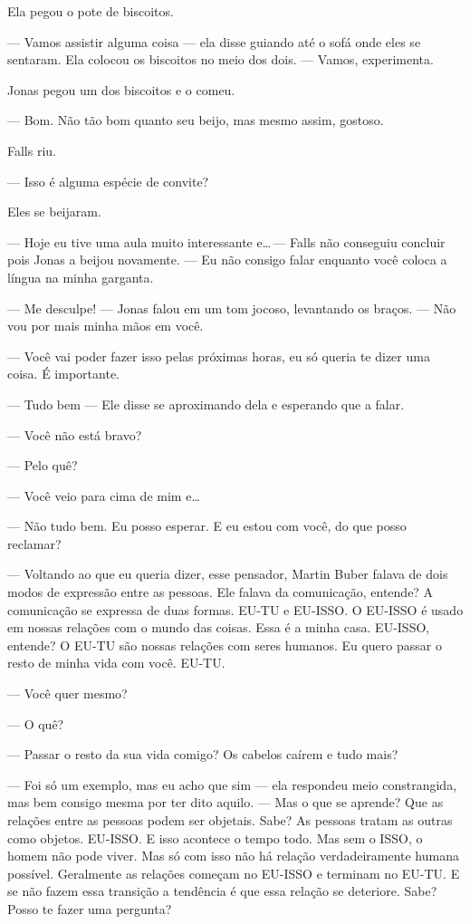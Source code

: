 Ela pegou o pote de biscoitos.

--- Vamos assistir alguma coisa --- ela disse\mudanca{,} guiando até o sofá\mudanca{,} onde eles se sentaram. Ela colocou os biscoitos no meio dos dois. --- Vamos, experimenta.

Jonas pegou um dos biscoitos e o comeu.

--- Bom. Não tão bom quanto seu beijo, mas mesmo assim, gostoso.

Falls riu.

--- Isso é alguma espécie de convite?

Eles se beijaram.

--- Hoje eu tive uma aula muito interessante e\ldots\,--- Falls não conseguiu concluir\mudanca{,} pois Jonas a beijou novamente. --- Eu não consigo falar enquanto você coloca a língua na minha garganta.

--- Me desculpe! --- Jonas falou em um tom jocoso, levantando os braços. --- Não vou por mais minha mãos em você.

--- Você vai poder fazer isso pelas próximas horas, eu só queria te dizer uma coisa. É importante.

--- Tudo bem --- Ele disse\mudanca{,} se aproximando dela e esperando que  a falar.

--- Você não está bravo?

--- Pelo quê?

--- Você veio para cima de mim e\ldots

--- Não\mudanca{,} tudo bem. Eu posso esperar. E eu estou com você, do que posso reclamar?

--- Voltando ao que eu queria dizer, esse pensador, Martin Buber\mudanca{,} falava de dois modos de expressão entre as pessoas. Ele falava da comunicação, entende? A comunicação se expressa de duas formas. EU-TU e EU-ISSO. O EU-ISSO é usado em nossas relações com o mundo das coisas. Essa é a minha casa. EU-ISSO, entende? O EU-TU são nossas relações com seres humanos. Eu quero passar o resto de minha vida com você. EU-TU.

--- Você quer mesmo?

--- O quê?

--- Passar o resto da sua vida comigo? Os cabelos caírem e tudo mais?

--- Foi só um exemplo, mas eu acho que sim --- ela respondeu\mudanca{,} meio constrangida, mas bem consigo mesma por ter dito aquilo. --- Mas o que se aprende? Que as relações entre as pessoas podem ser objetais. Sabe? As pessoas tratam as outras como objetos. EU-ISSO. E isso acontece o tempo todo. Mas sem o ISSO, o homem não pode viver. Mas só com isso não há relação verdadeiramente humana possível. Geralmente as relações começam no EU-ISSO e terminam no EU-TU. E se não fazem essa transição a tendência é que essa relação se deteriore. Sabe? Posso te fazer uma pergunta?

